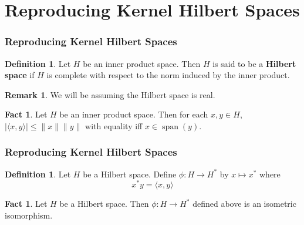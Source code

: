 \documentclass[notheorems]{beamer}
\theoremstyle{definition}
\newtheorem{defn}[definition]{Definition}
\newtheorem{fact}[definition]{Fact}
\newtheorem{rem}[definition]{Remark}
\renewcommand{\r}{\rangle}
\renewcommand{\l}{\langle}
\DeclareMathOperator{\spn}{span}
\begin{document}
\section{Reproducing Kernel Hilbert Spaces}
\begin{frame}
\frametitle{Reproducing Kernel Hilbert Spaces}



\begin{defn}
Let $H$ be an inner product space. Then $H$ is said to be a \textbf{Hilbert space} if $H$ is complete with respect to the norm induced by the inner product.
\end{defn}
\pause

\begin{rem}
We will be assuming the Hilbert space is real. 
\end{rem}
\pause

\begin{fact}
Let $H$ be an inner product space. Then for each $x,y \in H$, $|\l x, y\r| \leq \|x\| \|y\|$ with equality iff $x \in \spn(y)$.
\end{fact}
\end{frame}


















\begin{frame}
\frametitle{Reproducing Kernel Hilbert Spaces}

\begin{defn}
Let $H$ be a Hilbert space. Define $\phi:H \rightarrow H^*$ by $x \mapsto x^*$ where $$x^*y = \l x ,y\r$$
\end{defn}
\pause

\begin{fact}
Let $H$ be a Hilbert space. Then $\phi: H \rightarrow H^*$ defined above is an isometric isomorphism.
\end{fact}

\end{frame}
\end{document}
